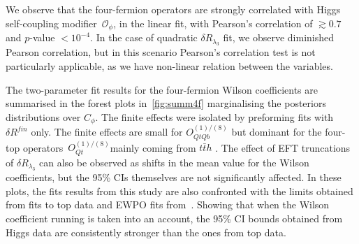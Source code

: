 We observe that the four-fermion operators are strongly correlated with Higgs self-coupling modifier~$\mathcal O_\phi$, in the linear fit, with Pearson's correlation of $ \gtrsim 0.7$ and $p$-value $< 10^{-4}$.  In the case of quadratic $\delta R_{\lambda_3}$ fit, we observe diminished Pearson correlation, but in this scenario Pearson's correlation test is not particularly applicable, as we have non-linear relation between the variables.
%
 \par The two-parameter fit results for the four-fermion Wilson coefficients are summarised in the forest plots in~\autoref{fig:summ4f} marginalising the posteriors distributions over $C_\phi$. The finite effects were isolated by preforming fits with $\delta R^{fin}$ only. The finite effects are small for  $O_{QtQb}^{(1)/(8)}$ but dominant for the four-top operators~$O_{Qt}^{(1)/(8)}$mainly coming from $t\bar t h$ .    The effect of EFT truncations of $\delta R_{\lambda_3}$ can also be observed as shifts in the mean value for the Wilson coefficients, but the 95\% CIs themselves are not significantly affected.  In these plots, the fits results from this study are also confronted with the limits obtained from fits to top data \cite{Ethier:2021bye, Ellis:2020unq, Hartland:2019bjb,Brivio:2019ius,DHondt:2018cww, Zhang:2017mls} and EWPO fits from~\cite{Dawson:2022bxd}. Showing that when the Wilson coefficient running is taken into an account, the 95\% CI  bounds obtained from Higgs data are consistently stronger than the ones from top data.

